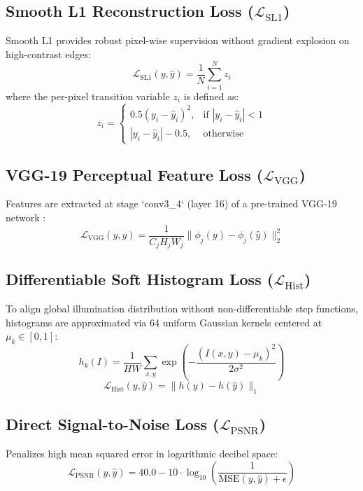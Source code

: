 \documentclass[10pt,twocolumn,letterpaper]{article}
\begin{document}
\subsection{Smooth L1 Reconstruction Loss (\texorpdfstring{$\mathcal{L}_{\text{SL1}}$}{L_SL1})}
Smooth L1 provides robust pixel-wise supervision without gradient explosion on high-contrast edges:
\begin{equation}
\mathcal{L}_{\text{SL1}}(y, \hat{y}) = \frac{1}{N} \sum_{i=1}^N z_i
\end{equation}
where the per-pixel transition variable $z_i$ is defined as:
\begin{equation}
z_i = \begin{cases} 0.5 (y_i - \hat{y}_i)^2, & \text{if } |y_i - \hat{y}_i| < 1 \\ |y_i - \hat{y}_i| - 0.5, & \text{otherwise} \end{cases}
\end{equation}

\subsection{VGG-19 Perceptual Feature Loss (\texorpdfstring{$\mathcal{L}_{\text{VGG}}$}{L_VGG})}
Features are extracted at stage `conv3\_4` (layer 16) of a pre-trained VGG-19 network \cite{johnson2016perceptual}:
\begin{equation}
\mathcal{L}_{\text{VGG}}(y, \hat{y}) = \frac{1}{C_j H_j W_j} \|\phi_j(y) - \phi_j(\hat{y})\|_2^2
\end{equation}

\subsection{Differentiable Soft Histogram Loss (\texorpdfstring{$\mathcal{L}_{\text{Hist}}$}{L_Hist})}
To align global illumination distribution without non-differentiable step functions, histograms are approximated via 64 uniform Gaussian kernels centered at $\mu_k \in [0, 1]$:
\begin{equation}
h_k(I) = \frac{1}{HW} \sum_{x, y} \exp\left(-\frac{(I(x, y) - \mu_k)^2}{2\sigma^2}\right)
\end{equation}
\begin{equation}
\mathcal{L}_{\text{Hist}}(y, \hat{y}) = \|h(y) - h(\hat{y})\|_1
\end{equation}

\subsection{Direct Signal-to-Noise Loss (\texorpdfstring{$\mathcal{L}_{\text{PSNR}}$}{L_PSNR})}
Penalizes high mean squared error in logarithmic decibel space:
\begin{equation}
\mathcal{L}_{\text{PSNR}}(y, \hat{y}) = 40.0 - 10 \cdot \log_{10}\left(\frac{1}{\text{MSE}(y, \hat{y}) + \epsilon}\right)
\end{equation}
\end{document}
